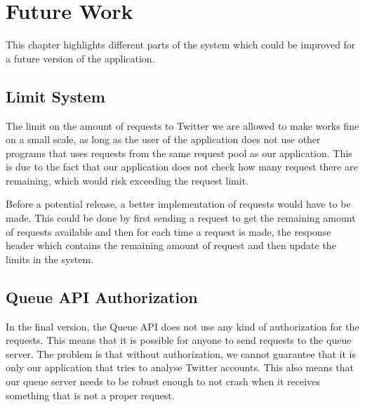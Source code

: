 \chapter{Future Work}\label{fwork}
This chapter highlights different parts of the system which could
be improved for a future version of the application.

\section{Limit System}
The limit on the amount of requests to Twitter we are allowed to make works fine
on a small scale, as long as the user of the application does not use other
programs that uses requests from the same request pool as our application. This
is due to the fact that our application does not check how many request there
are remaining, which would risk exceeding the request limit. \nl

Before a potential release, a better implementation of requests would have to be
made. This could be done by first sending a request to get the remaining amount
of requests available and then for each time a request is made, the response
header which contains the remaining amount of request and then update the limits
in the system.\nl


{}

\section{Queue API Authorization}
In the final version, the Queue API does not use any kind of authorization for
the requests. This means that it is possible for anyone to send requests to the
queue server. The problem is that without authorization, we cannot guarantee
that it is only our application that tries to analyse Twitter accounts. This
also means that our queue server needs to be robust enough to not crash when it
receives something that is not a proper request. \nl

